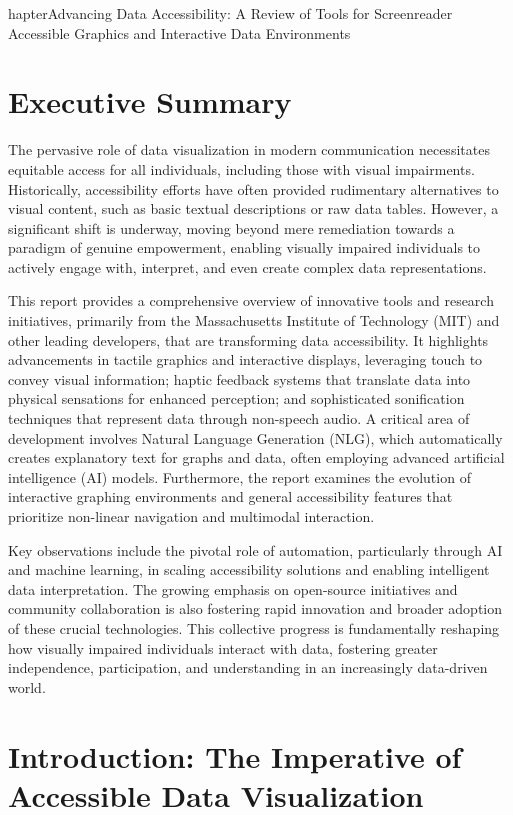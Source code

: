 hapter{Advancing Data Accessibility: A Review of Tools for Screenreader Accessible Graphics and Interactive Data Environments}

\section{Executive Summary}
The pervasive role of data visualization in modern communication necessitates equitable access for all individuals, including those with visual impairments. Historically, accessibility efforts have often provided rudimentary alternatives to visual content, such as basic textual descriptions or raw data tables. However, a significant shift is underway, moving beyond mere remediation towards a paradigm of genuine empowerment, enabling visually impaired individuals to actively engage with, interpret, and even create complex data representations.

This report provides a comprehensive overview of innovative tools and research initiatives, primarily from the Massachusetts Institute of Technology (MIT) and other leading developers, that are transforming data accessibility. It highlights advancements in tactile graphics and interactive displays, leveraging touch to convey visual information; haptic feedback systems that translate data into physical sensations for enhanced perception; and sophisticated sonification techniques that represent data through non-speech audio. A critical area of development involves Natural Language Generation (NLG), which automatically creates explanatory text for graphs and data, often employing advanced artificial intelligence (AI) models. Furthermore, the report examines the evolution of interactive graphing environments and general accessibility features that prioritize non-linear navigation and multimodal interaction.

Key observations include the pivotal role of automation, particularly through AI and machine learning, in scaling accessibility solutions and enabling intelligent data interpretation. The growing emphasis on open-source initiatives and community collaboration is also fostering rapid innovation and broader adoption of these crucial technologies. This collective progress is fundamentally reshaping how visually impaired individuals interact with data, fostering greater independence, participation, and understanding in an increasingly data-driven world.

\section{Introduction: The Imperative of Accessible Data Visualization}


